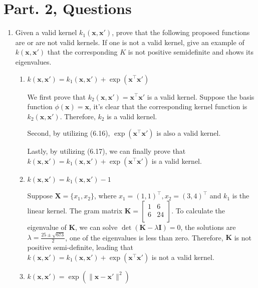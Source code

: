 \documentclass[twocolumn]{extarticle}
\begin{document}
\section{Part. 2, Questions}


\begin{enumerate}
\item Given a valid kernel \( k_1(\mathbf{x}, \mathbf{x}') \), prove that the following proposed functions are or are not valid kernels. If one is not a valid kernel, give an example of \( k(\mathbf{x}, \mathbf{x}') \) that the corresponding \( K \) is not positive semidefinite and shows its eigenvalues.

\begin{enumerate}[label=\alph*.]
    \item \( k(\mathbf{x}, \mathbf{x}') = k_1(\mathbf{x}, \mathbf{x}') + \exp(\mathbf{x}^\top \mathbf{x}') \)
    
    We first prove that $k_2(\mathbf{x}, \mathbf{x}') = \mathbf{x}^\top \mathbf{x}'$ is a valid kernel. Suppose the basis function $\phi(\mathbf{x})=\mathbf{x}$, it's clear that the corresponding kernel function is $k_2(\mathbf{x}, \mathbf{x}')$. Therefore, $k_2$ is a valid kernel.
    
    Second, by utilizing (6.16), $\exp(\mathbf{x}^\top \mathbf{x}')$ is also a valid kernel.
    
    Lastly, by utilizing (6.17), we can finally prove that $ k(\mathbf{x}, \mathbf{x}') = k_1(\mathbf{x}, \mathbf{x}') + \exp(\mathbf{x}^\top \mathbf{x}')$ is a valid kernel.
    \item \( k(\mathbf{x}, \mathbf{x}') = k_1(\mathbf{x}, \mathbf{x}') - 1 \)
    
    Suppose $\mathbf{X}=\{x_1, x_2\}$, where $x_1=(1, 1)^\top, x_2=(3, 4)^\top$ and $k_1$ is the linear kernel. The gram matrix $\mathbf{K}=\left[ \begin{array}{cc}
    1 & 6 \\
    6 & 24 \\
    \end{array} \right]$. To calculate the eigenvalue of $\mathbf{K}$, we can solve $\det(\mathbf{K}-\lambda\mathbf{I})=0$, the solutions are $\lambda=\frac{25\pm\sqrt{673}}{2}$, one of the eigenvalues is less than zero. Therefore, $\mathbf{K}$ is not positive semi-definite, leading that $k(\mathbf{x}, \mathbf{x}') = k_1(\mathbf{x}, \mathbf{x}') + \exp(\mathbf{x}^\top \mathbf{x}')$ is not a valid kernel.
    
    \item \( k(\mathbf{x}, \mathbf{x}') = \exp(\|\mathbf{x} - \mathbf{x}'\|^2) \)
    

\end{enumerate}
\end{enumerate}
\end{document}

